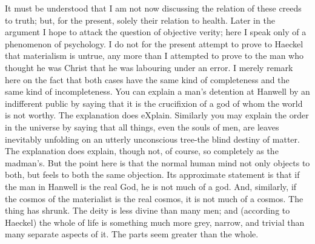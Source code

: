 \documentclass{book}
\begin{document}
It must be understood that I am not now discussing the relation of these creeds to truth; but, for the present, solely their relation to health. Later in the argument I hope to attack the question of objective verity; here I speak only of a phenomenon of psychology. I do not for the present attempt to prove to Haeckel that materialism is untrue, any more than I attempted to prove to the man who thought he was Christ that he was labouring under an error. I merely remark here on the fact that both cases have the same kind of completeness and the same kind of incompleteness. You can explain a man’s detention at Hanwell by an indifferent public by saying that it is the crucifixion of a god of whom the world is not worthy. The explanation does eXplain. Similarly you may explain the order in the universe by saying that all things, even the souls of men, are leaves inevitably unfolding on an utterly unconscious tree-the blind destiny of matter. The explanation does explain, though not, of course, so completely as the madman’s. But the point here is that the normal human mind not only objects to both, but feels to both the same objection. Its approximate statement is that if the man in Hanwell is the real God, he is not much of a god. And, similarly, if the cosmos of the materialist is the real cosmos, it is not much of a cosmos. The thing has shrunk. The deity is less divine than many men; and (according to Haeckel) the whole of life is something much more grey, narrow, and trivial than many separate aspects of it. The parts seem greater than the whole.
\end{document}
